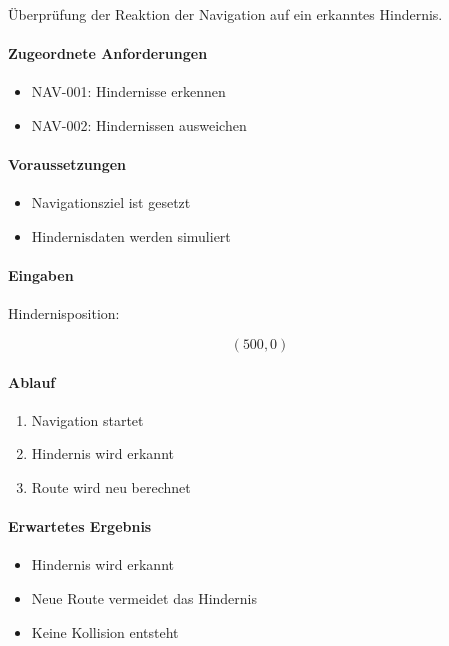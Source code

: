 \documentclass[
  a4paper,
  12pt,
  DIV=12,        %
  parskip=half,  %
  headings=small %
]{scrartcl}
\theoremstyle{definition}
\providecommand{\tightlist}{%
  \setlength{\itemsep}{0pt}\setlength{\parskip}{0pt}}
\theoremstyle{definition}
\begin{document}
Überprüfung der Reaktion der Navigation auf ein erkanntes Hindernis.

\paragraph{Zugeordnete Anforderungen}\label{zugeordnete-anforderungen-3}

\begin{itemize}
\tightlist
\item
  NAV-001: Hindernisse erkennen
\item
  NAV-002: Hindernissen ausweichen
\end{itemize}

\paragraph{Voraussetzungen}\label{voraussetzungen-3}

\begin{itemize}
\tightlist
\item
  Navigationsziel ist gesetzt
\item
  Hindernisdaten werden simuliert
\end{itemize}

\paragraph{Eingaben}\label{eingaben-3}

Hindernisposition:

\[
(500,0)
\]

\paragraph{Ablauf}\label{ablauf-3}

\begin{enumerate}
\def\labelenumi{\arabic{enumi}.}
\tightlist
\item
  Navigation startet
\item
  Hindernis wird erkannt
\item
  Route wird neu berechnet
\end{enumerate}

\paragraph{Erwartetes Ergebnis}\label{erwartetes-ergebnis-3}

\begin{itemize}
\tightlist
\item
  Hindernis wird erkannt
\item
  Neue Route vermeidet das Hindernis
\item
  Keine Kollision entsteht
\end{itemize}
\end{document}
